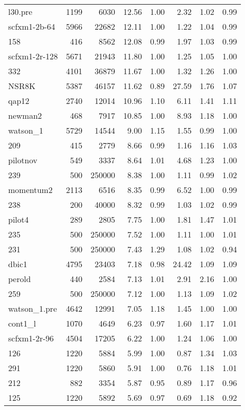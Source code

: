 \documentclass[10pt]{article}
\begin{document}
\begin{longtable}{|l|r|r|r|r|r|r|r|}
l30.pre	&	1199	&	6030	&	12.56	&	1.00	&	2.32	&	1.02	&	0.99	\\
scfxm1-2b-64	&	5966	&	22682	&	12.11	&	1.00	&	1.22	&	1.04	&	0.99	\\
158	&	416	&	8562	&	12.08	&	0.99	&	1.97	&	1.03	&	0.99	\\
scfxm1-2r-128	&	5671	&	21943	&	11.80	&	1.00	&	1.25	&	1.05	&	1.00	\\
332	&	4101	&	36879	&	11.67	&	1.00	&	1.32	&	1.26	&	1.00	\\
NSR8K	&	5387	&	46157	&	11.62	&	0.89	&	27.59	&	1.76	&	1.07	\\
qap12	&	2740	&	12014	&	10.96	&	1.10	&	6.11	&	1.41	&	1.11	\\
newman2	&	468	&	7917	&	10.85	&	1.00	&	8.93	&	1.18	&	1.00	\\
watson\_1	&	5729	&	14544	&	9.00	&	1.15	&	1.55	&	0.99	&	1.00	\\
209	&	415	&	2779	&	8.66	&	0.99	&	1.16	&	1.16	&	1.03	\\
pilotnov	&	549	&	3337	&	8.64	&	1.01	&	4.68	&	1.23	&	1.00	\\
239	&	500	&	250000	&	8.38	&	1.00	&	1.11	&	0.99	&	1.02	\\
momentum2	&	2113	&	6516	&	8.35	&	0.99	&	6.52	&	1.00	&	0.99	\\
238	&	200	&	40000	&	8.32	&	0.99	&	1.03	&	1.02	&	0.99	\\
pilot4	&	289	&	2805	&	7.75	&	1.00	&	1.81	&	1.47	&	1.01	\\
235	&	500	&	250000	&	7.52	&	1.00	&	1.11	&	1.00	&	1.01	\\
231	&	500	&	250000	&	7.43	&	1.29	&	1.08	&	1.02	&	0.94	\\
dbic1	&	4795	&	23403	&	7.18	&	0.98	&	24.42	&	1.09	&	1.09	\\
perold	&	440	&	2584	&	7.13	&	1.01	&	2.91	&	2.16	&	1.00	\\
259	&	500	&	250000	&	7.12	&	1.00	&	1.13	&	1.09	&	1.02	\\
watson\_1.pre	&	4642	&	12991	&	7.05	&	1.18	&	1.45	&	1.00	&	1.00	\\
cont1\_l	&	1070	&	4649	&	6.23	&	0.97	&	1.60	&	1.17	&	1.01	\\
scfxm1-2r-96	&	4504	&	17205	&	6.22	&	1.00	&	1.24	&	1.06	&	1.00	\\
126	&	1220	&	5884	&	5.99	&	1.00	&	0.87	&	1.34	&	1.03	\\
291	&	1220	&	5860	&	5.91	&	1.00	&	0.76	&	1.18	&	1.01	\\
212	&	882	&	3354	&	5.87	&	0.95	&	0.89	&	1.17	&	0.96	\\
125	&	1220	&	5892	&	5.69	&	0.97	&	0.69	&	1.18	&	0.92	\\

\end{longtable}
\end{document}
